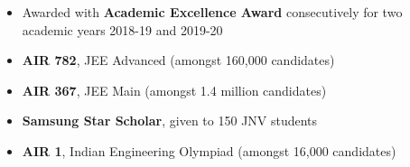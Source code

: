 

\begin{itemize}
	\item Awarded with \textbf{Academic Excellence Award} consecutively for two academic years 2018-19 and 2019-20
	\item \textbf{AIR 782}, JEE Advanced (amongst 160,000 candidates)
	\item \textbf{AIR 367}, JEE Main (amongst 1.4 million candidates)
	\item \textbf{Samsung Star Scholar}, given to 150 JNV students
	\item \textbf{AIR 1}, Indian Engineering Olympiad (amongst 16,000 candidates)
\end{itemize}


